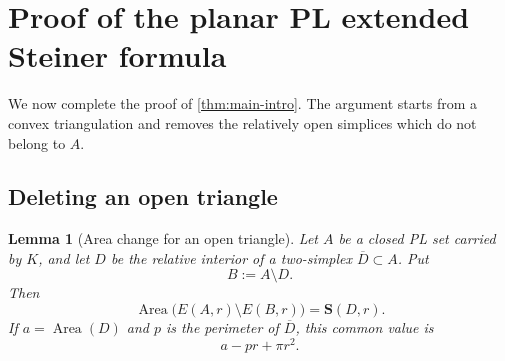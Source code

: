 \documentclass[11pt]{article}
\newtheorem{lemma}[theorem]{Lemma}
\newcommand{\Area}{\operatorname{Area}}
\newcommand{\Steiner}{\mathbf S}
\numberwithin{equation}{section}
\begin{document}
 \section{Proof of the planar PL extended Steiner formula}\label{sec:main-proof}

We now complete the proof of \cref{thm:main-intro}. The argument starts from a convex triangulation and removes the relatively open simplices which do not belong to $A$.

\subsection{Deleting an open triangle}

\begin{lemma}[Area change for an open triangle]\label{lem:triangle-deletion}
Let $A$ be a closed PL set carried by $K$, and let $D$ be the relative interior of a two-simplex $\overline D\subset A$. Put
\[
B:=A\setminus D.
\]
Then
\[
\boxed{
\Area\bigl(E(A,r)\setminus E(B,r)\bigr)
=
\Steiner(D,r).
}
\]
If $a=\Area(D)$ and $p$ is the perimeter of $\overline D$, this common value is
\[
a-pr+\pi r^2.
\]
\end{lemma}
\end{document}

